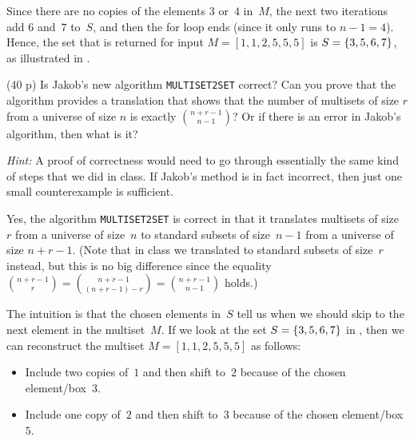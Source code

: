\documentclass{jn-pset}
\begin{document}
\begin{problem}
\begin{solution}
  Since there are no copies of the elements $3$ or~$4$ in~$M$,
  the next two iterations add
  $6$ and~$7$ to~$S$,
  and then the for loop ends
  (since it only runs to $n-1 = 4$).
  Hence,
  the set that is returned
  for input
  $M = [1, 1, 2, 5, 5, 5]$
  is
  $
  S = \{ 3, 5, 6, 7 \}
  $,
  as illustrated in
  .  
\end{solution}

  \begin{subproblem}%
    \label{problem:multiset-2}%
    {(40 p)}
    {\ignorespaces}
    Is Jakob's new algorithm
    \verb+MULTISET2SET+
    correct? Can you prove that the
    algorithm provides a
    translation that shows that the number of multisets of size $r$ from
    a universe of size $n$ is exactly $\binom{n + r - 1}{n-1}$? Or if there is an
    error in Jakob's algorithm, then what is it?

    \smallskip
    \noindent
    \emph{Hint:}
    A proof of correctness would need to go through essentially the
    same kind of steps that we did in class. If Jakob's method is in
    fact incorrect, then just one small counterexample is sufficient.
  \end{subproblem}

\begin{solution}
  Yes,
  the algorithm
  \verb+MULTISET2SET+
  is correct in that it   translates 
  multisets of size~$r$ from   a universe of size~$n$
  to standard subsets of size~$n - 1$ from a universe of size
  $n + r - 1$.
  (Note that in class we translated to standard subsets of size~$r$ instead,
  but this is no big difference since the equality
  $
  \binom{n + r - 1}{r}
  =
  \binom{n + r - 1}{(n + r - 1 ) - r}
  =
  \binom{n + r - 1}{n-1}
  $
  holds.)
  
  The intuition is that the chosen elements in~$S$ tell us when we
  should skip to the next element in the multiset~$M$.
  If we look at the set
  $S = \{ 3, 5, 6, 7 \}$
  in 
  ,
  then we can reconstruct the multiset
  $M = [1, 1, 2, 5, 5, 5]$
  as follows:
  \begin{itemize}
  \item
    Include two copies of~$1$ and then shift to~$2$
    because of the chosen element/box~$3$.
    
  \item
    Include one copy of~$2$ and then shift to~$3$
    because of the chosen element/box~$5$.
    

\end{itemize}
\end{solution}
\end{problem}
\end{document}
